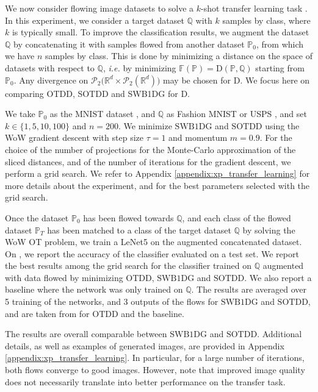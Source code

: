 \documentclass[twoside]{article}
\newcommand{\cP}{\mathcal{P}}
\newcommand{\bP}{\mathbb{P}}
\newcommand{\bQ}{\mathbb{Q}}
\newcommand{\bF}{\mathbb{F}}
\newcommand{\sotdd}{\mathrm{SOTDD}}
\newcommand{\R}{\mathbb{R}}
\newcommand{\swbdg}{\mathrm{SWB1DG}}
\begin{document}
 We now consider flowing image datasets to solve a $k$-shot transfer learning task \citep{alvarez2021dataset, hua2023dynamic}. In this experiment, we consider a target dataset $\bQ$ with $k$ samples by class, where $k$ is typically small. To improve the classification results, we augment the dataset $\bQ$ by concatenating it with samples flowed from another dataset $\bP_0$, from which we have $n$ samples by class. This is done by minimizing a distance on the space of datasets with respect to $\bQ$, \emph{i.e.} by minimizing $\bF(\bP)=\mathrm{D}(\bP,\bQ)$ starting from $\bP_0$. Any divergence on $\cP_2\big(\R^d\times \cP_2(\R^d)\big)$ may be chosen for $\mathrm{D}$. We focus here on comparing OTDD, SOTDD and SWB1DG for $\mathrm{D}$.

 We take $\bP_0$ as the MNIST dataset \citep{lecun2010mnist}, and $\bQ$ as Fashion MNIST \citep{xiao2017fashion} or USPS \citep{hull1994database}, and set $k\in \{1,5,10,100\}$ and $n=200$. We minimize $\swbdg$ and $\sotdd$ using the WoW gradient descent with step size $\tau=1$ and momentum $m=0.9$. For the choice of the number of projections for the Monte-Carlo approximation of the sliced distances, and of the number of iterations for the gradient descent, we perform a grid search. We refer to Appendix \ref{appendix:xp_transfer_learning} for more details about the experiment, and for the best parameters selected with the grid search.

Once the dataset $\bP_0$ has been flowed towards $\bQ$, and each class of the flowed dataset $\bP_T$ has been matched to a class of the target dataset $\bQ$ by solving the WoW OT problem, we train a LeNet5 on the augmented concatenated dataset. On , we report the accuracy of the classifier evaluated on a test set. We report the best results among the grid search for the classifier trained on $\bQ$ augmented with data flowed by minimizing OTDD, $\swbdg$ and $\sotdd$. We also report a baseline where the network was only trained on $\bQ$. The results are averaged over 5 training of the networks, and 3 outputs of the flows for $\swbdg$ and $\sotdd$, and are taken from \citep{bonet2025flowing} for OTDD and the baseline. %





The results are overall comparable between $\swbdg$ and $\sotdd$. Additional details, as well as examples of generated images, are provided in Appendix \ref{appendix:xp_transfer_learning}. In particular, for a large number of iterations, both flows converge to good images. However, note that improved image quality does not necessarily translate into better performance on the transfer task.
\end{document}

